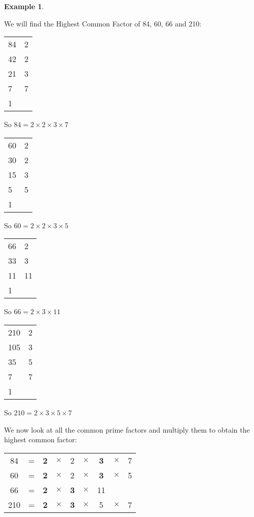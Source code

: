 \documentclass[11pt, oneside]{article}
\theoremstyle{definition}
\newtheorem{exmp}{Example}[section]
\begin{document}
\begin{exmp} \end{exmp}
We will find the Highest Common Factor of 84, 60, 66 and 210:

\begin{tabular}{ p{0.5cm} | p{1.5cm}}
84 & 2  \\
42 & 2  \\
21 & 3  \\
7 & 7  \\
1 &  
\end{tabular}

So $84 = 2 \times 2 \times 3 \times 7$

\bigbreak

\begin{tabular}{ p{0.5cm} | p{1.5cm}}
60 & 2  \\
30 & 2  \\
15 & 3  \\
5 & 5 \\
1 
\end{tabular}

So $60 = 2 \times 2 \times 3 \times 5$

\bigbreak

\begin{tabular}{ p{0.5cm} | p{1.5cm}}
66 & 2  \\
33 & 3  \\
11 & 11 \\
1 
\end{tabular}

So $66 = 2 \times 3 \times 11$

\bigbreak

\begin{tabular}{ p{0.5cm} | p{1.5cm}}
210 & 2  \\
105 & 3  \\
35 & 5 \\
7 & 7 \\
1 
\end{tabular}

So $210 = 2 \times 3 \times 5 \times 7$

We now look at all the common prime factors and multiply them to obtain the highest common factor:

\begin{tabular}{c c c c c c c c c}
84 & = & {\bf2} & $\times $ & 2 & $\times$  & {\bf3} & $\times$ & 7  \\
60 & = & {\bf2} & $\times $ & 2 & $\times$  & {\bf3} & $\times $ & 5 \\
66 & = & {\bf2} & $\times $ & {\bf3} & $\times$  & 11 &  & \\
210 & = & {\bf2} & $\times $ & {\bf3} & $\times$  & 5 & $\times $ & 7
\end{tabular}
\end{document}
